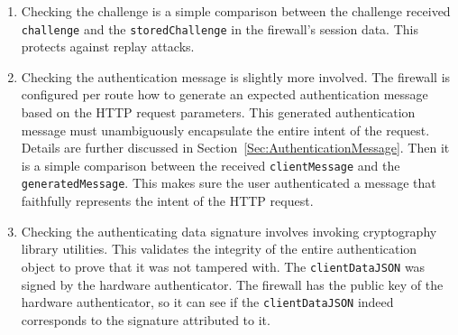 \begin{enumerate}[nosep]

\item Checking the challenge is a simple comparison between the challenge received \lstinline{challenge} and the \lstinline{storedChallenge} in the firewall's session data. This protects against replay attacks.


\item Checking the authentication message is slightly more involved. The firewall is configured per route how to generate an expected authentication message based on the HTTP request parameters. This generated authentication message must unambiguously encapsulate the entire intent of the request. Details are further discussed in Section~\ref{Sec:AuthenticationMessage}. Then it is a simple comparison between the received \lstinline{clientMessage} and the \lstinline{generatedMessage}. This makes sure the user authenticated a message that faithfully represents the intent of the HTTP request.


\item Checking the authenticating data signature involves invoking cryptography library utilities. This validates the integrity of the entire authentication object to prove that it was not tampered with. The \lstinline{clientDataJSON} was signed by the hardware authenticator. The firewall has the public key of the hardware authenticator, so it can see if the \lstinline{clientDataJSON} indeed corresponds to the signature attributed to it.

\end{enumerate}


